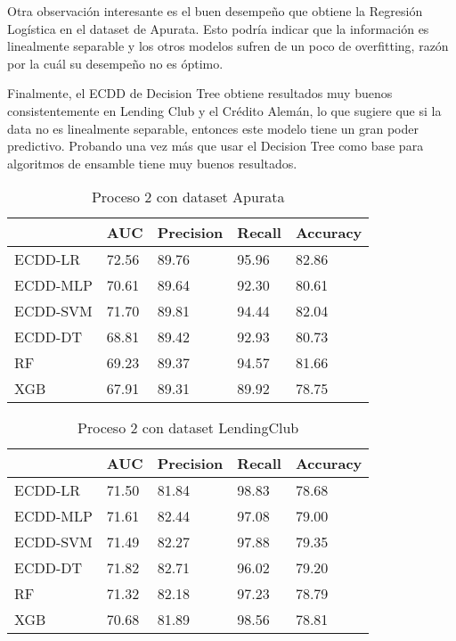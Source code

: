 Otra observación interesante es el buen desempeño que obtiene la Regresión Logística en el dataset de Apurata. Esto podría indicar que la información es linealmente separable y los otros modelos sufren de un poco de overfitting, razón por la cuál su desempeño no es óptimo.

Finalmente, el \ac{ECDD} de Decision Tree obtiene resultados muy buenos consistentemente en Lending Club y el Crédito Alemán, lo que sugiere que si la data no es linealmente separable, entonces este modelo tiene un gran poder predictivo. Probando una vez más que usar el Decision Tree como base para algoritmos de ensamble tiene muy buenos resultados.

\begin{table}[]
\centering
\caption{Proceso 2 con dataset Apurata}
\label{tab:apurata-proc2}
\begin{tabularx}{0.75\textwidth}{|l|Y Y Y Y|}
                \hline
                & AUC       & Precision & Recall    & Accuracy  \\
                \hline
ECDD-LR    		& 72.56     & 89.76     & 95.96     & 82.86		\\
ECDD-MLP   		& 70.61     & 89.64     & 92.30     & 80.61		\\
ECDD-SVM   		& 71.70     & 89.81     & 94.44     & 82.04		\\
ECDD-DT    		& 68.81     & 89.42     & 92.93     & 80.73		\\
				\hline
RF       		& 69.23     & 89.37     & 94.57     & 81.66		\\
XGB      		& 67.91     & 89.31     & 89.92     & 78.75		\\
                \hline
\end{tabularx}
\end{table}


\begin{table}[]
\centering
\caption{Proceso 2 con dataset LendingClub}
\label{tab:lc-proc2}
\begin{tabularx}{0.75\textwidth}{|l|Y Y Y Y|}
                \hline
                & AUC       & Precision & Recall    & Accuracy  \\
                \hline
ECDD-LR           & 71.50     & 81.84     & 98.83     & 78.68     \\
ECDD-MLP          & 71.61     & 82.44     & 97.08     & 79.00     \\
ECDD-SVM          & 71.49     & 82.27     & 97.88     & 79.35     \\
ECDD-DT           & 71.82     & 82.71     & 96.02     & 79.20     \\
                \hline
RF              & 71.32     & 82.18     & 97.23     & 78.79     \\
XGB             & 70.68     & 81.89     & 98.56     & 78.81     \\
                \hline
\end{tabularx}
\end{table}


